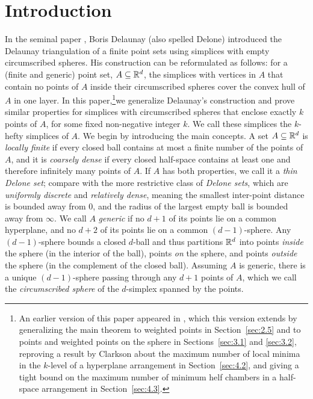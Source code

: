 \documentclass[10pt,a4paper]{article}
\newcommand {\mm}[1] {\ifmmode{#1}\else{\mbox{\(#1\)}}\fi}
\theoremstyle{plain}
\newcommand{\Rspace}        {\mm{{\mathbb R}}}
\begin{document}
\section{Introduction}
\label{sec:1}
In the seminal paper \cite{Del34}, Boris Delaunay (also spelled Delone) introduced the Delaunay triangulation of a finite point sets using simplices with empty circumscribed spheres. 
His construction can be reformulated as follows: 
for a (finite and generic) point set, $A \subseteq \Rspace^d$, the simplices with vertices in $A$ that contain no points of $A$ inside their circumscribed spheres cover the convex hull of $A$ in one layer.
In this paper,\footnote{An earlier version of this paper appeared in \cite{EGS25}, which this version extends by generalizing the main theorem to weighted points in Section~\ref{sec:2.5} and to points and weighted points on the sphere in Sections~\ref{sec:3.1} and \ref{sec:3.2}, reproving a result by Clarkson about the maximum number of local minima in the $k$-level of a hyperplane arrangement in Section~\ref{sec:4.2}, and giving a tight bound on the maximum number of minimum helf chambers in a half-space arrangement in Section~\ref{sec:4.3}.}we generalize Delaunay's construction and prove similar properties for simplices with circumscribed spheres that enclose exactly $k$ points of $A$, for some fixed non-negative integer $k$.
We call these simplices the $k$-hefty simplices of $A$. 
\smallskip
We begin by introducing the main concepts.
A set $A \subseteq \Rspace^d$ is \emph{locally finite} if every closed ball contains at most a finite number of the points of $A$, and it is \emph{coarsely dense} if every closed half-space contains at least one and therefore infinitely many points of $A$.
If $A$ has both properties, we call it a \emph{thin Delone set}; compare with the more restrictive class of \emph{Delone sets}, which are \emph{uniformly discrete} and \emph{relatively dense}, meaning the smallest inter-point distance is bounded away from $0$, and the radius of the largest empty ball is bounded away from $\infty$.
We call $A$ \emph{generic} if no $d+1$ of its points lie on a common hyperplane, and no $d+2$ of its points lie on a common $(d-1)$-sphere.
Any $(d-1)$-sphere bounds a closed $d$-ball and thus partitions $\Rspace^d$ into points \emph{inside} the sphere (in the interior of the ball), points \emph{on} the sphere, and points \emph{outside} the sphere (in the complement of the closed ball).
Assuming $A$ is generic, there is a unique $(d-1)$-sphere passing through any $d+1$ points of $A$, which we call the \emph{circumscribed sphere} of the $d$-simplex spanned by the points.
\end{document}
